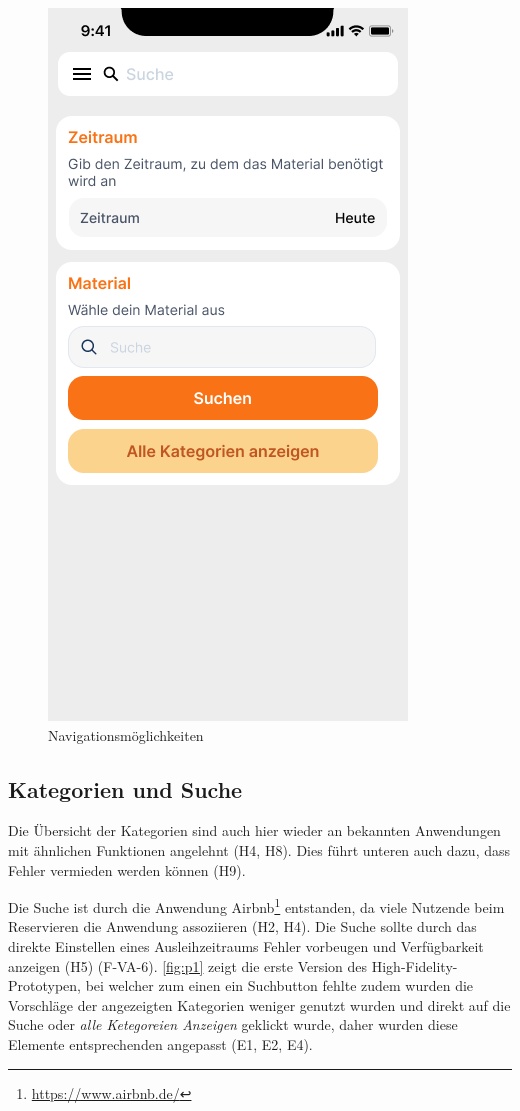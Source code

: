 \begin{figure}[h]
    \includegraphics[scale=0.4]{Bilder/Prototyp/Neu/Suche V2.png}
    \caption[-]{Navigationsmöglichkeiten}
    \label{fig:nav}
\end{figure}

\subsection{Kategorien und Suche}
Die Übersicht der Kategorien sind auch hier wieder an bekannten
Anwendungen mit ähnlichen Funktionen angelehnt (H4, H8). Dies führt unteren auch dazu, dass Fehler 
vermieden werden können (H9). 

Die Suche ist durch die Anwendung Airbnb\footnote{\url{https://www.airbnb.de/}} entstanden, da viele
Nutzende beim Reservieren die Anwendung assoziieren (H2, H4). Die Suche sollte durch das direkte
Einstellen eines Ausleihzeitraums Fehler vorbeugen und Verfügbarkeit anzeigen (H5) (F-VA-6).
\ref{fig:p1} zeigt die erste Version des High-Fidelity-Prototypen, bei welcher zum einen ein
Suchbutton fehlte zudem wurden die Vorschläge der angezeigten Kategorien weniger genutzt wurden und
direkt auf die Suche oder \textit{alle Ketegoreien Anzeigen} geklickt wurde, daher wurden diese
Elemente entsprechenden angepasst (E1, E2, E4).

